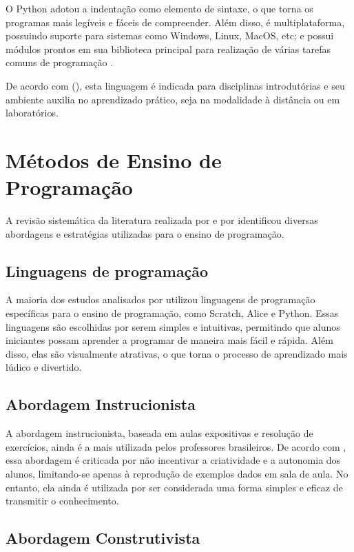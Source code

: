 O Python adotou a indentação como elemento de sintaxe, o que torna os programas mais legíveis e fáceis de compreender. Além disso, é multiplataforma, possuindo suporte para sistemas como Windows, Linux, MacOS, etc; e possui módulos prontos em sua biblioteca principal para realização de várias tarefas comuns de programação \cite{moraispires2002}.

De acordo com \citeauthor{fangohr2004} (\citeyear{fangohr2004}), esta linguagem é indicada para disciplinas introdutórias e seu ambiente auxilia no aprendizado prático, seja na modalidade à distância ou em laboratórios.

\section{Métodos de Ensino de Programação}

A revisão sistemática da literatura realizada por \cite{Silva2014} e por \cite{Silva2018} identificou diversas abordagens e estratégias utilizadas para o ensino de programação.

\subsection{Linguagens de programação}

A maioria dos estudos analisados por \cite{Silva2014} utilizou linguagens de programação específicas para o ensino de programação, como Scratch, Alice e Python. Essas linguagens são escolhidas por serem simples e intuitivas, permitindo que alunos iniciantes possam aprender a programar de maneira mais fácil e rápida. Além disso, elas são visualmente atrativas, o que torna o processo de aprendizado mais lúdico e divertido.

\subsection{Abordagem Instrucionista}

A abordagem instrucionista, baseada em aulas expositivas e resolução de exercícios, ainda é a mais utilizada pelos professores brasileiros. De acordo com \cite{Silva2018}, essa abordagem é criticada por não incentivar a criatividade e a autonomia dos alunos, limitando-se apenas à reprodução de exemplos dados em sala de aula. No entanto, ela ainda é utilizada por ser considerada uma forma simples e eficaz de transmitir o conhecimento.

\subsection{Abordagem Construtivista}

